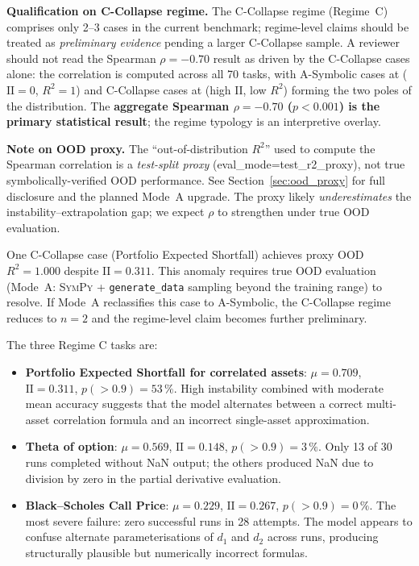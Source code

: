 \documentclass[twoside,11pt]{article}
\newcommand{\Rsq}{R^{2}}
\newcommand{\II}{\mathrm{II}}
\begin{document}
\textbf{Qualification on C-Collapse regime.}  The C-Collapse regime
(Regime~C) comprises only 2--3 cases in the current benchmark; regime-level
claims should be treated as \emph{preliminary evidence} pending a larger
C-Collapse sample.  A reviewer should not read the Spearman $\rho=-0.70$ result
as driven by the C-Collapse cases alone: the correlation is computed across all
70 tasks, with A-Symbolic cases at ($\II=0$, $\Rsq=1$) and C-Collapse cases at
(high $\II$, low $\Rsq$) forming the two poles of the distribution.  The
\textbf{aggregate Spearman $\rho=-0.70$ ($p<0.001$) is the primary statistical
result}; the regime typology is an interpretive overlay.

\textbf{Note on OOD proxy.}  The ``out-of-distribution $\Rsq$'' used to compute
the Spearman correlation is a \emph{test-split proxy} (eval\_mode=test\_r2\_proxy),
not true symbolically-verified OOD performance.  See Section~\ref{sec:ood_proxy}
for full disclosure and the planned Mode~A upgrade.  The proxy likely
\emph{underestimates} the instability--extrapolation gap; we expect $\rho$ to
strengthen under true OOD evaluation.

One C-Collapse case (Portfolio Expected Shortfall) achieves proxy OOD $\Rsq=1.000$
despite $\II=0.311$.  This anomaly requires true OOD evaluation (Mode~A:
\textsc{SymPy} + \texttt{generate\_data} sampling beyond the training range) to
resolve.  If Mode~A reclassifies this case to A-Symbolic, the C-Collapse regime
reduces to $n=2$ and the regime-level claim becomes further preliminary.

The three Regime C tasks are:
\begin{itemize}
  \item \textbf{Portfolio Expected Shortfall for correlated assets}:
    $\mu=0.709$, $\II=0.311$, $p(>0.9)=53\,\%$.  High instability combined with
    moderate mean accuracy suggests that the model alternates between a correct
    multi-asset correlation formula and an incorrect single-asset approximation.
  \item \textbf{Theta of option}: $\mu=0.569$, $\II=0.148$, $p(>0.9)=3\,\%$.
    Only 13 of 30 runs completed without NaN output; the others produced NaN due
    to division by zero in the partial derivative evaluation.
  \item \textbf{Black--Scholes Call Price}: $\mu=0.229$, $\II=0.267$, $p(>0.9)=0\,\%$.
    The most severe failure: zero successful runs in 28 attempts.  The model
    appears to confuse alternate parameterisations of $d_1$ and $d_2$ across runs,
    producing structurally plausible but numerically incorrect formulas.
\end{itemize}
\end{document}
